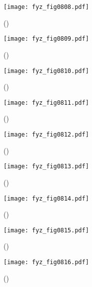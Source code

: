     \begin{figure}[ht!] %
      \centering
      \texttt{[image: fyz\_fig0808.pdf]}
      \caption{
               (\cite[s.~707]{Feynman02})}
      \label{fyz:fig0808}
    \end{figure}

    \begin{figure}[ht!] %
      \centering
      \texttt{[image: fyz\_fig0809.pdf]}
      \caption{
               (\cite[s.~707]{Feynman02})}
      \label{fyz:fig0809}
    \end{figure}
    
    \begin{figure}[ht!] %
      \centering
      \texttt{[image: fyz\_fig0810.pdf]}
      \caption{
               (\cite[s.~707]{Feynman02})}
      \label{fyz:fig0810}
    \end{figure}


    \begin{figure}[ht!] %
      \centering
      \texttt{[image: fyz\_fig0811.pdf]}
      \caption{
               (\cite[s.~707]{Feynman02})}
      \label{fyz:fig0811}
    \end{figure}

    \begin{figure}[ht!] %
      \centering
      \texttt{[image: fyz\_fig0812.pdf]}
      \caption{
               (\cite[s.~707]{Feynman02})}
      \label{fyz:fig0812}
    \end{figure}
    
    \begin{figure}[ht!] %
      \centering
      \texttt{[image: fyz\_fig0813.pdf]}
      \caption{
               (\cite[s.~707]{Feynman02})}
      \label{fyz:fig0813}
    \end{figure}

    \begin{figure}[ht!] %
      \centering
      \texttt{[image: fyz\_fig0814.pdf]}
      \caption{
               (\cite[s.~707]{Feynman02})}
      \label{fyz:fig0814}
    \end{figure}
    
    \begin{figure}[ht!] %
      \centering
      \texttt{[image: fyz\_fig0815.pdf]}
      \caption{
               (\cite[s.~707]{Feynman02})}
      \label{fyz:fig0815}
    \end{figure}


    \begin{figure}[ht!] %
      \centering
      \texttt{[image: fyz\_fig0816.pdf]}
      \caption{
               (\cite[s.~707]{Feynman02})}
      \label{fyz:fig0816}
    \end{figure}


